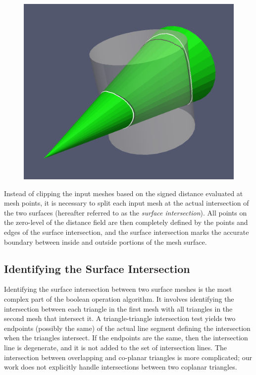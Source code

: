 \documentclass{InsightArticle}
\begin{document}
\begin{figure}[h]
\centering
\includegraphics[scale=0.25]{Figures/DistanceZeroLevelVsIntersection}
\label{fig:DistanceZeroLevelVsIntersection}
\end{figure}

Instead of clipping the input meshes based on the signed distance evaluated at mesh points, it is necessary to split each input mesh at the actual intersection of the two surfaces (hereafter referred to as the \emph{surface intersection}). All points on the zero-level of the distance field are then completely defined by the points and edges of the surface intersection, and the surface intersection marks the accurate boundary between inside and outside portions of the mesh surface.

\subsection{Identifying the Surface Intersection}

Identifying the surface intersection between two surface meshes is the most complex part of the boolean operation algorithm. It involves identifying the intersection between each triangle in the first mesh with all triangles in the second mesh that intersect it. A triangle-triangle intersection test yields two endpoints (possibly the same) of the actual line segment defining the intersection when the triangles intersect. If the endpoints are the same, then the intersection line is degenerate, and it is not added to the set of intersection lines. The intersection between overlapping and co-planar triangles is more complicated; our work does not explicitly handle intersections between two coplanar triangles.
\end{document}
